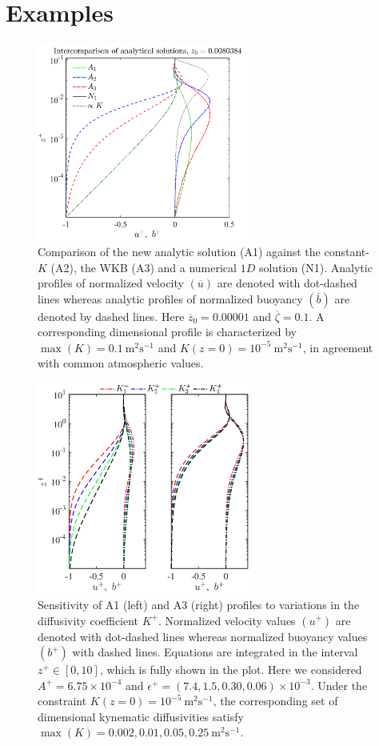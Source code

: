 \section{Examples}
%
\begin{figure}
   \begin{center}
      \includegraphics[width= 70.0mm]{./comparison_normalized_analytic_solutions_z0=1e-05}
      \caption{Comparison of the new analytic solution (A1) against the constant-$K$ (A2), the WKB (A3) and a numerical $1D$ solution (N1). Analytic profiles of normalized velocity $(\overline{u})$ are denoted with dot-dashed lines whereas analytic profiles of normalized buoyancy $(\overline{b})$ are denoted by dashed lines. Here $\overline{z}_0 = 0.00001$ and $\overline{\zeta} = 0.1$. A corresponding dimensional profile is characterized by $\max{(K)} = 0.1 \ \mathrm{m^2s^{-1}}$ and $K(z=0) = 10^{-5} \ \mathrm{m^2s^{-1}}$, in agreement with common atmospheric values.}
      \label{fig1}
   \end{center}
\end{figure}
%
\begin{figure}
    \begin{center}
    \includegraphics[width= 70.0mm]{./u-b_log_various_K}
    \caption{Sensitivity of A1 (left) and A3 (right) profiles to variations in the diffusivity coefficient $K^+$. Normalized velocity values $(u^+)$ are denoted with dot-dashed lines whereas normalized buoyancy values $(b^+)$ with dashed lines. Equations are integrated in  the interval $z^+ \in [0,10]$, which is fully shown in the plot. Here we considered $A^+=6.75 \times 10^{-4}$ and $\epsilon^+  = (7.4,1.5,0.30,0.06) \times 10^{-3}$. Under the constraint $K(z=0) = 10^{-5} \ \mathrm{m^2s^{-1}}$, the corresponding set of dimensional kynematic diffusivities satisfy $\max{(K)}=0.002,0.01,0.05,0.25 \ \mathrm{m^2s^{-1}}$.}
    \label{fig3}
    \end{center}
\end{figure}
